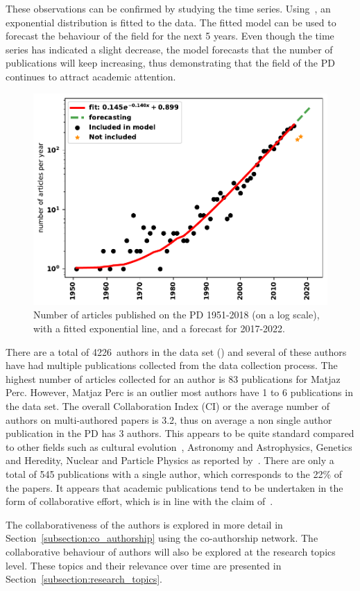 \documentclass{article}
\theoremstyle{definition}
\newcommand{\authors}{4226}
\begin{document}
These observations can be confirmed by studying the time series.
Using~\citep{scipy}, an exponential distribution is fitted to the data.
The fitted model can be used to forecast the
behaviour of the field for the next 5 years. Even
though the time series has indicated a slight decrease, the model forecasts that
the number of publications will keep increasing, thus demonstrating that the
field of the PD continues to attract academic attention.

\begin{figure}[!hbtp]
    \centering
    \includegraphics[width=.50\textwidth]{forecasting.pdf}
    \caption{Number of articles published on the PD 1951-2018 (on a log scale),
    with a fitted exponential line, and a forecast for 2017-2022.}\label{fig:timeseries}
\end{figure}

There are a total of \authors~authors in the data set (\citep{pd_data_2018}) and several of these
authors have had multiple publications collected from the data collection process.
The highest number of articles collected for an
author is 83 publications for Matjaz Perc. However, Matjaz Perc is an outlier
most authors have 1 to 6 publications in the data set.
The overall Collaboration Index (CI) or the average number of authors on
multi-authored papers is 3.2, thus on average a non single author publication in
the PD has 3 authors. This appears to be quite standard compared to other fields
such as cultural evolution~\citep{youngblood2018}, Astronomy and Astrophysics,
Genetics and Heredity, Nuclear and Particle Physics as reported
by~\citep{nature_author_blog}.
There are only a total of 545 publications with a single author, which
corresponds to the 22\% of the papers. It appears that academic publications
tend to be undertaken in the form of collaborative effort, which is in line
with the claim of~\citep{Kyvik2017}.

The collaborativeness of the authors is explored in more detail in
Section~\ref{subsection:co_authorship} using the co-authorship network. The collaborative
behaviour of authors will also be explored at the research topics level. These topics and their
relevance over time are presented in Section~\ref{subsection:research_topics}.
\end{document}
